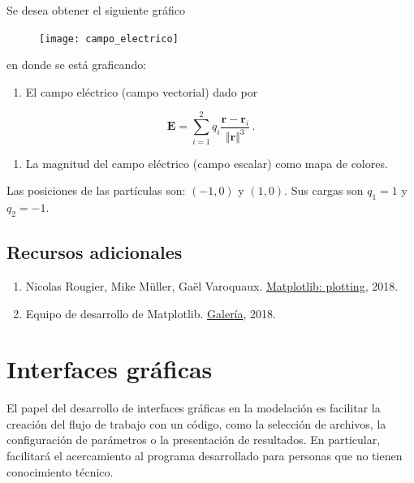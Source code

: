 Se desea obtener el siguiente gráfico

\begin{figure}[H]
    \centering
    \texttt{[image: campo\_electrico]}
\end{figure}

en donde se está graficando:

\begin{enumerate}
\def\labelenumi{\arabic{enumi}.}

\item
  El campo eléctrico (campo vectorial) dado por
\end{enumerate}

\[\mathbf{E} = \sum_{i=1}^2 q_i \frac{\mathbf{r} - \mathbf{r}_i}{\Vert \mathbf{r}\Vert^3}\, .\]

\begin{enumerate}
\def\labelenumi{\arabic{enumi}.}
\setcounter{enumi}{1}

\item
  La magnitud del campo eléctrico (campo escalar) como mapa de colores.
\end{enumerate}

Las posiciones de las partículas son: \((-1, 0)\) y \((1, 0)\). Sus
cargas son \(q_1 = 1\) y \(q_2=-1\).

\subsection{Recursos adicionales}

\begin{enumerate}
\def\labelenumi{\arabic{enumi}.}

\item
  Nicolas Rougier, Mike Müller, Gaël Varoquaux.
  \href{http://www.scipy-lectures.org/intro/matplotlib/index.html}{Matplotlib:
  plotting}, 2018.
\item
  Equipo de desarrollo de Matplotlib.
  \href{https://matplotlib.org/gallery/index.html}{Galería}, 2018.
\end{enumerate}


\section{Interfaces gráficas}

El papel del desarrollo de interfaces gráficas en la modelación es facilitar la
creación del flujo de trabajo con un código, como la selección de archivos, la
configuración de parámetros o la presentación de resultados. En particular, facilitará
el acercamiento al programa desarrollado para personas que no tienen conocimiento técnico.

